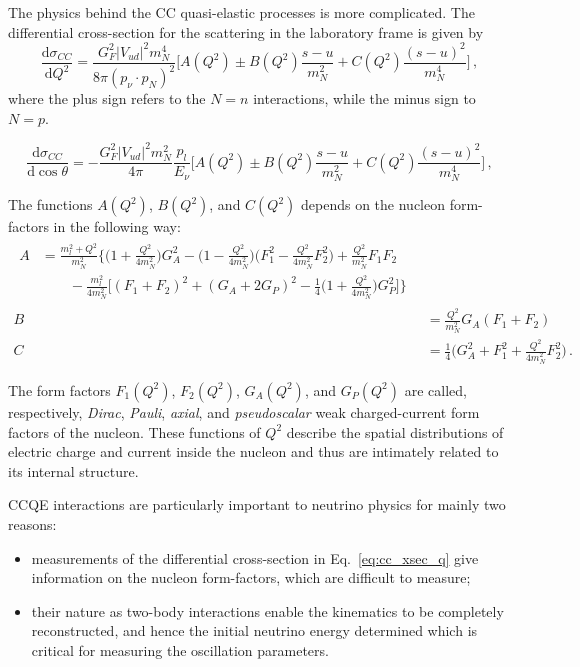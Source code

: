 The physics behind the CC quasi-elastic processes is more complicated.
The differential cross-section for the scattering in the laboratory frame is given by
\begin{equation}
	\label{eq:cc_xsec_q}
	\frac{\mathrm{d} \sigma_{CC}}{\mathrm{d}Q^2} = \frac{G_F^2 |V_{ud}|^2 m_N^4}{8\pi (p_\nu \cdot p_N)^2} %
	\bigg [A(Q^2) \pm B(Q^2) \frac{s-u}{m_N^2} + C(Q^2) \frac{(s-u)^2}{m_N^4} \bigg]\,,
\end{equation}
where the plus sign refers to the $N = n$ interactions, while the minus sign to $N = p$.

\begin{equation}
	\label{eq:cc_xsec_t}
	\frac{\mathrm{d} \sigma_{CC}}{\mathrm{d}\cos\theta} = -\frac{G_F^2 |V_{ud}|^2 m_N^2}{4\pi} \frac{p_l}{E_\nu} %
	\bigg [A(Q^2) \pm B(Q^2) \frac{s-u}{m_N^2} + C(Q^2) \frac{(s-u)^2}{m_N^4} \bigg]\,,
\end{equation}

The functions $A(Q^2)$, $B(Q^2)$, and $C(Q^2)$ depends on the nucleon form-factors in the following way:
\begin{align}
	\begin{split}
		\label{eq:A(Q)}
		A &= \frac{m_l^2+Q^2}{m_N^2} \bigg\{ \bigg(1+\frac{Q^2}{4m_N^2}\bigg) G_A^2 - \bigg(1-\frac{Q^2}{4m_N^2}\bigg) %
		\bigg(F_1^2 - \frac{Q^2}{4m_N^2}F_2^2 \bigg) +\frac{Q^2}{m_N^2} F_1 F_2 \\
		&\qquad- \frac{m_l^2}{4m_N^2} %
		\bigg[ (F_1+F_2)^2+(G_A+2G_P)^2-\frac{1}{4}\bigg(1+\frac{Q^2}{4m_N^2}\bigg) G_P^2 \bigg] \bigg\}\, 
	\end{split}\\
	\label{eq:B(Q)}
	B &= \frac{Q^2}{m_N^2} G_A (F_1+F_2)\,\\
	\label{eq:C(Q)}
	C &= \frac{1}{4} \big (G_A^2 +F_1^2+\frac{Q^2}{4m_N^2}F_2^2\big)\,.
\end{align}

The form factors $F_1(Q^2)$, $F_2(Q^2)$, $G_A(Q^2)$, and $G_P(Q^2)$ are called, respectively, \emph{Dirac}, %
\emph{Pauli}, \emph{axial}, and \emph{pseudoscalar} weak charged-current form factors of the nucleon.
These functions of $Q^2$ describe the spatial distributions of electric charge and current inside the nucleon %
and thus are intimately related to its internal structure.

CCQE interactions are particularly important to neutrino physics for mainly two reasons:
\begin{itemize}
	\item measurements of the differential cross-section in Eq.~\ref{eq:cc_xsec_q} give information on the %
		nucleon form-factors, which are difficult to measure; 
	\item their nature as two-body interactions enable the kinematics to be completely reconstructed, %
		and hence the initial neutrino energy determined which is critical for measuring the oscillation parameters.
\end{itemize}

